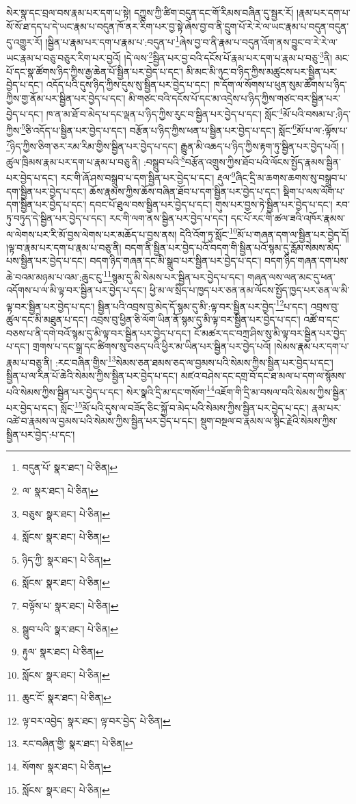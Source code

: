 སེར་སྣ་དང་བྲལ་བས་རྣམ་པར་དག་པ་སྟེ། དཀྱུས་ཀྱི་ཚིག་བདུན་དང་གོ་རིམས་བཞིན་དུ་སྦྱར་རོ། །རྣམ་པར་དག་པ་སོ་སོ་ཐ་དད་པ་དེ་ཡང་རྣམ་པ་བདུན་ཁོ་ནར་རིག་པར་བྱ་སྟེ་ཞེས་བྱ་བ་ནི་དྲུག་པོ་རེ་རེ་ལ་ཡང་རྣམ་པ་བདུན་བདུན་དུ་འགྱུར་རོ། །སྦྱིན་པ་རྣམ་པར་དག་པ་རྣམ་པ་:བདུན་པ་\footnote{བདུན་པོ་  སྣར་ཐང་།  པེ་ཅིན། }ཞེས་བྱ་བ་ནི་རྣམ་པ་བདུན་འོག་ནས་བྱུང་བ་རེ་རེ་ལ་ཡང་རྣམ་པ་བཅུ་བཅུར་རིག་པར་བྱའོ། །དེ་ལས་\footnote{ལ་  སྣར་ཐང་།  པེ་ཅིན། }སྦྱིན་པར་བྱ་བའི་དངོས་པོ་རྣམ་པར་དག་པ་རྣམ་པ་བཅུ་\footnote{བཅུས་  སྣར་ཐང་།  པེ་ཅིན། }ནི། མང་པོ་དང་སྣ་ཚོགས་ཉིད་ཀྱིས་རྒྱ་ཆེན་པོ་སྦྱིན་པར་བྱེད་པ་དང་། མི་མང་མི་ཉུང་བ་ཉིད་ཀྱིས་མཚུངས་པར་སྦྱིན་པར་བྱེད་པ་དང་། འདོད་པའི་དུས་ཉིད་ཀྱིས་དུས་སུ་སྦྱིན་པར་བྱེད་པ་དང་། ཁ་དོག་ལ་སོགས་པ་ཕུན་སུམ་ཚོགས་པ་ཉིད་ཀྱིས་གྱ་ནོམ་པར་སྦྱིན་པར་བྱེད་པ་དང་། མི་གཙང་བའི་དངོས་པོ་དང་མ་འདྲེས་པ་ཉིད་ཀྱིས་གཙང་བར་སྦྱིན་པར་བྱེད་པ་དང་། ཁ་ན་མ་ཐོ་བ་མེད་པ་དང་ལྡན་པ་ཉིད་ཀྱིས་རུང་བ་སྦྱིན་པར་བྱེད་པ་དང་། སློང་\footnote{སློངས་  སྣར་ཐང་།  པེ་ཅིན། }མོ་པའི་བསམ་པ་:ཉིད་ཀྱིས་\footnote{ཉིད་ཀྱི་  སྣར་ཐང་།  པེ་ཅིན། }ཅི་འདོད་པ་སྦྱིན་པར་བྱེད་པ་དང་། བརྩོན་པ་ཉིད་ཀྱིས་ཕན་པ་སྦྱིན་པར་བྱེད་པ་དང་། སློང་\footnote{སློངས་  སྣར་ཐང་།  པེ་ཅིན། }མོ་པ་ལ་:ལྟོས་པ་\footnote{བལྟོས་པ་  སྣར་ཐང་།  པེ་ཅིན། }ཉིད་ཀྱིས་ཅིག་ཅར་རམ་རིམ་གྱིས་སྦྱིན་པར་བྱེད་པ་དང་། རྒྱུན་མི་འཆད་པ་ཉིད་ཀྱིས་རྟག་ཏུ་སྦྱིན་པར་བྱེད་པའོ། །ཚུལ་ཁྲིམས་རྣམ་པར་དག་པ་རྣམ་པ་བཅུ་ནི། :བསྒྲུབ་པའི་\footnote{སྒྲུབ་པའི་  སྣར་ཐང་།  པེ་ཅིན། }བརྩོན་འགྲུས་ཀྱིས་ཐོབ་པའི་ལོངས་སྤྱོད་རྣམས་སྦྱིན་པར་བྱེད་པ་དང་། རང་གི་ཞོ་ཤས་བསྒྲུབ་པ་དག་སྦྱིན་པར་བྱེད་པ་དང་། རྡུལ་\footnote{རྟུལ་  སྣར་ཐང་།  པེ་ཅིན། }ཞིང་དྲི་མ་ཆགས་ཆགས་སུ་བསྒྲུབ་པ་དག་སྦྱིན་པར་བྱེད་པ་དང་། ཆོས་རྣམས་ཀྱིས་ཆོས་བཞིན་ཐོབ་པ་དག་སྦྱིན་པར་བྱེད་པ་དང་། སྡིག་པ་ལས་ལོག་པ་དག་སྦྱིན་པར་བྱེད་པ་དང་། དབང་པོ་ཐུལ་བས་སྦྱིན་པར་བྱེད་པ་དང་། གུས་པར་བྱས་ཏེ་སྦྱིན་པར་བྱེད་པ་དང་། རབ་ཏུ་བཏུད་དེ་སྦྱིན་པར་བྱེད་པ་དང་། རང་གི་ལག་ནས་སྦྱིན་པར་བྱེད་པ་དང་། དང་པོ་རང་གི་ཚལ་ཟའི་འཁོར་རྣམས་ལ་ལེགས་པར་རི་མོ་བྱས་ལེགས་པར་མཆོད་པ་བྱས་ནས། དེའི་འོག་ཏུ་སློང་\footnote{སློངས་  སྣར་ཐང་།  པེ་ཅིན། }མོ་པ་གཞན་དག་ལ་སྦྱིན་པར་བྱེད་དོ། །ལྟ་བ་རྣམ་པར་དག་པ་རྣམ་པ་བཅུ་ནི། བདག་ནི་སྦྱིན་པར་བྱེད་པའོ་བདག་གི་སྦྱིན་པའོ་སྙམ་དུ་རློམ་སེམས་མེད་པས་སྦྱིན་པར་བྱེད་པ་དང་། བདག་ཉིད་གཞན་དང་མི་སྒྲུབ་པར་སྦྱིན་པར་བྱེད་པ་དང་། བདག་ཉིད་གཞན་དག་པས་ཆེ་བའམ་མཉམ་པ་འམ་:ཆུང་ངུ་\footnote{ཆུང་ངོ་  སྣར་ཐང་།  པེ་ཅིན། }སྙམ་དུ་མི་སེམས་པར་སྦྱིན་པར་བྱེད་པ་དང་། གཞན་ལས་ལན་མང་དུ་ཕན་འདོགས་པ་ལ་མི་ལྟ་བར་སྦྱིན་པར་བྱེད་པ་དང་། ཕྱི་མ་ལ་སྲིད་པ་ཁྱད་པར་ཅན་ནམ་ལོངས་སྤྱོད་ཁྱད་པར་ཅན་ལ་མི་ལྟ་བར་སྦྱིན་པར་བྱེད་པ་དང་། སྦྱིན་པའི་འབྲས་བུ་མེད་དོ་སྙམ་དུ་མི་:ལྟ་བར་སྦྱིན་པར་བྱེད་\footnote{ལྟ་བར་འབྱེད་  སྣར་ཐང་། ལྟ་བར་བྱེད་  པེ་ཅིན། }པ་དང་། འབྲས་བུ་ཚུལ་དང་མི་མཐུན་པ་དང་། འབྲས་བུ་ཕྱིན་ཅི་ལོག་ཡིན་ནོ་སྙམ་དུ་མི་ལྟ་བར་སྦྱིན་པར་བྱེད་པ་དང་། འཚོ་བ་དང་བཅས་པ་ནི་དགེ་བའོ་སྙམ་དུ་མི་ལྟ་བར་སྦྱིན་པར་བྱེད་པ་དང་། ངོ་མཚར་དང་བཀྲ་ཤིས་སུ་མི་ལྟ་བར་སྦྱིན་པར་བྱེད་པ་དང་། གྲགས་པ་དང་སྒྲ་དང་ཚིགས་སུ་བཅད་པའི་ཕྱིར་མ་ཡིན་པར་སྦྱིན་པར་བྱེད་པའོ། །སེམས་རྣམ་པར་དག་པ་རྣམ་པ་བཅུ་ནི། :རང་བཞིན་གྱིས་\footnote{རང་བཞིན་གྱི་  སྣར་ཐང་།  པེ་ཅིན། }སེམས་ཅན་ཐམས་ཅད་ལ་བྱམས་པའི་སེམས་ཀྱིས་སྦྱིན་པར་བྱེད་པ་དང་། སྦྱིན་པ་ལ་རིན་པོ་ཆེའི་སེམས་ཀྱིས་སྦྱིན་པར་བྱེད་པ་དང་། མཛའ་བཤེས་དང་དགྲ་བོ་དང་ཐ་མལ་པ་དག་ལ་སྙོམས་པའི་སེམས་ཀྱིས་སྦྱིན་པར་བྱེད་པ་དང་། སེར་སྣའི་དྲི་མ་དང་གསོག་\footnote{སོགས་  སྣར་ཐང་།  པེ་ཅིན། }འཇོག་གི་དྲི་མ་བསལ་བའི་སེམས་ཀྱིས་སྦྱིན་པར་བྱེད་པ་དང་། སློང་\footnote{སློངས་  སྣར་ཐང་།  པེ་ཅིན། }མོ་པའི་དུས་ལ་བཟོད་ཅིང་སྐྱོ་བ་མེད་པའི་སེམས་ཀྱིས་སྦྱིན་པར་བྱེད་པ་དང་། རྣམ་པར་འཚེ་བ་རྣམས་ལ་བྱམས་པའི་སེམས་ཀྱིས་སྦྱིན་པར་བྱེད་པ་དང་། སྡུག་བསྔལ་བ་རྣམས་ལ་སྙིང་རྗེའི་སེམས་ཀྱིས་སྦྱིན་པར་བྱེད་:པ་དང་། 